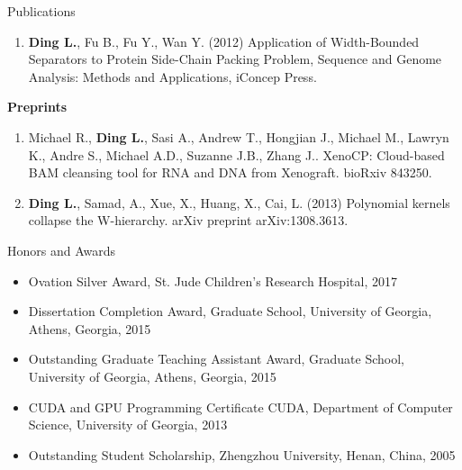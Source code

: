 \documentclass{resume} %
\begin{document}
\begin{rSection}{Publications}
\begin{enumerate}
\item \textbf{Ding L.}, Fu B., Fu Y., Wan Y. (2012) Application of Width-Bounded Separators to Protein Side-Chain Packing Problem, Sequence and Genome Analysis: Methods and Applications, iConcep Press.
\end{enumerate}


\textbf{Preprints}
\begin{enumerate}
\item Michael R., \textbf{Ding L.}, Sasi A., Andrew T., Hongjian J., Michael M., Lawryn K., Andre S., Michael A.D., Suzanne J.B., Zhang J.. XenoCP: Cloud-based BAM cleansing tool for RNA and DNA from Xenograft. bioRxiv 843250.

\item \textbf{Ding L.}, Samad, A., Xue, X., Huang, X., Cai, L. (2013) Polynomial kernels collapse the W-hierarchy. arXiv preprint arXiv:1308.3613.
\end{enumerate}
\end{rSection}


\begin{rSection}{Honors and Awards}
\begin{itemize}
\item Ovation Silver Award, St. Jude Children’s Research Hospital, 2017
\item Dissertation Completion Award, Graduate School, University of Georgia, Athens, Georgia, 2015
\item Outstanding Graduate Teaching Assistant Award,  Graduate School, University of Georgia, Athens, Georgia, 2015
\item CUDA and GPU Programming Certificate CUDA, Department of Computer Science, University of Georgia, 2013
\item Outstanding Student Scholarship, Zhengzhou University, Henan, China, 2005
\end{itemize}
\end{rSection}
\end{document}
